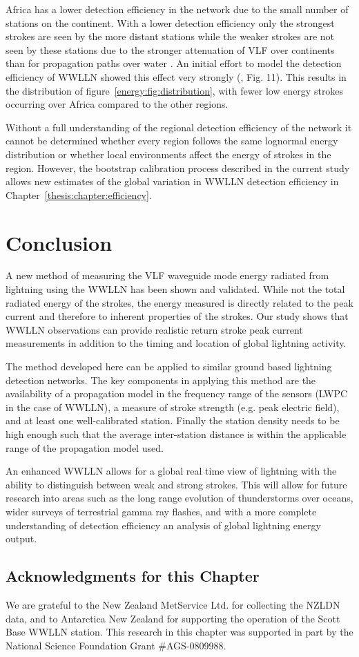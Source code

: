 Africa has a lower detection efficiency in the network due to the small number of stations on the continent.
With a lower detection efficiency only the strongest strokes are seen by the more distant stations while the weaker strokes are not seen by these stations due to the stronger attenuation of VLF over continents than for propagation paths over water \citep{Wait1970}.
An initial effort to model the detection efficiency of WWLLN showed this effect very strongly (\citet{Rodger2006}, Fig. 11).
This results in the distribution of figure~\ref{energy:fig:distribution}, with fewer low energy strokes occurring over Africa compared to the other regions.

Without a full understanding of the regional detection efficiency of the network it cannot be determined whether every region follows the same lognormal energy distribution or whether local environments affect the energy of strokes in the region.
However, the bootstrap calibration process described in the current study allows new estimates of the global variation in WWLLN detection efficiency in Chapter~\ref{thesis:chapter:efficiency}.

\section{Conclusion}

A new method of measuring the VLF waveguide mode energy radiated from lightning using the WWLLN has been shown and validated.
While not the total radiated energy of the strokes, the energy measured is directly related to the peak current and therefore to inherent properties of the strokes.
Our study shows that WWLLN observations can provide realistic return stroke peak current measurements in addition to the timing and location of global lightning activity.

The method developed here can be applied to similar ground based lightning detection networks.
The key components in applying this method are the availability of a propagation model in the frequency range of the sensors (LWPC in the case of WWLLN), a measure of stroke strength (e.g. peak electric field), and at least one well-calibrated station.
Finally the station density needs to be high enough such that the average inter-station distance is within the applicable range of the propagation model used.

An enhanced WWLLN allows for a global real time view of lightning with the ability to distinguish between weak and strong strokes.
This will allow for future research into areas such as the long range evolution of thunderstorms over oceans, wider surveys of terrestrial gamma ray flashes, and with a more complete understanding of detection efficiency an analysis of global lightning energy output.

\subsection*{Acknowledgments for this Chapter} 
We are grateful to the New Zealand MetService Ltd. for collecting the NZLDN data, and to Antarctica New Zealand for supporting the operation of the Scott Base WWLLN station.
This research in this chapter was supported in part by the National Science Foundation Grant \#AGS-0809988.
